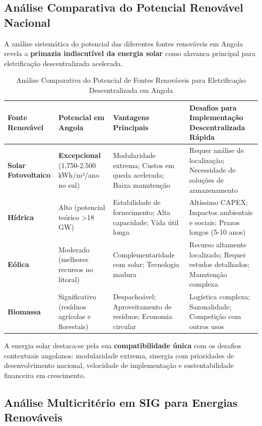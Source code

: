 \documentclass[12pt, a4paper]{article}
\begin{document}
\subsection{Análise Comparativa do Potencial Renovável Nacional}

A análise sistemática do potencial das diferentes fontes renováveis em Angola revela a \textbf{primazia indiscutível da energia solar} como alavanca principal para eletrificação descentralizada acelerada.

\begin{table}[H]
\centering
\caption{Análise Comparativa do Potencial de Fontes Renováveis para Eletrificação Descentralizada em Angola}
\label{tab:potencial_comparativo}
\begin{tabular}{@{}>{\raggedright\arraybackslash}p{3cm}>{\raggedright\arraybackslash}p{2.5cm}>{\raggedright\arraybackslash}p{3.5cm}>{\raggedright\arraybackslash}p{4cm}@{}}
\toprule
\textbf{Fonte Renovável} & \textbf{Potencial em Angola} & \textbf{Vantagens Principais} & \textbf{Desafios para Implementação Descentralizada Rápida} \\
\midrule
\textbf{Solar Fotovoltaico} & \textbf{Excepcional} (1.750-2.500 kWh/m²/ano no sul) & Modularidade extrema; Custos em queda acelerada; Baixa manutenção & Requer análise de localização; Necessidade de soluções de armazenamento \\
\textbf{Hídrica} & Alto (potencial teórico >18 GW) & Estabilidade de fornecimento; Alta capacidade; Vida útil longa & Altíssimo CAPEX; Impactos ambientais e sociais; Prazos longos (5-10 anos) \\
\textbf{Eólica} & Moderado (melhores recursos no litoral) & Complementaridade com solar; Tecnologia madura & Recurso altamente localizado; Requer estudos detalhados; Manutenção complexa \\
\textbf{Biomassa} & Significativo (resíduos agrícolas e florestais) & Despachoável; Aproveitamento de resíduos; Economia circular & Logística complexa; Sazonalidade; Competição com outros usos \\
\bottomrule
\end{tabular}
\end{table}

A energia solar destaca-se pela sua \textbf{compatibilidade única} com os desafios contextuais angolanos: modularidade extrema, sinergia com prioridades de desenvolvimento nacional, velocidade de implementação e sustentabilidade financeira em crescimento.

\subsection{Análise Multicritério em SIG para Energias Renováveis}
\end{document}
